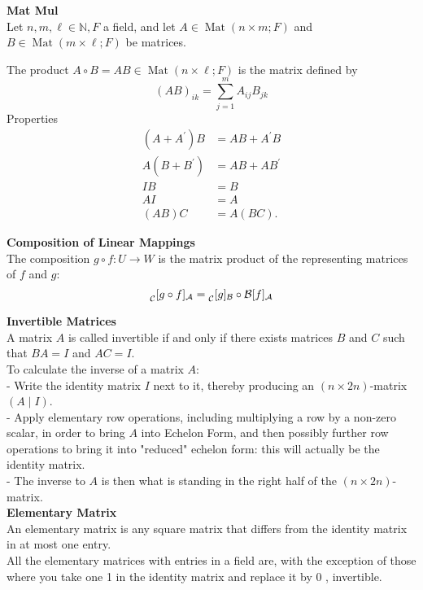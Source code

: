 \documentclass[a4paper, 10pt]{article}
\begin{document}
\begin{multicols*}{3}
\textbf{Mat Mul}\\
Let $n, m, \ell \in \mathbb{N}, F$ a field, and let $A \in \operatorname{Mat}(n \times m ; F)$ and $B \in \operatorname{Mat}(m \times \ell ; F)$ be matrices. 

The product $A \circ B=A B \in \operatorname{Mat}(n \times \ell ; F)$ is the matrix defined by
$$
(A B)_{i k}=\sum_{j=1}^m A_{i j} B_{j k}
$$
Properties\\
\begin{align*}
\left(A+A^{\prime}\right) B & =A B+A^{\prime} B \\
A\left(B+B^{\prime}\right) & =A B+A B^{\prime} \\
I B & =B \\
A I & =A \\
(A B) C & =A(B C) .
\end{align*}

\textbf{Composition of Linear Mappings}\\
The composition $g \circ f: U \rightarrow W$ is the matrix product of the representing matrices of $f$ and $g$:
$$
\prescript{}{\mathcal{C}}{[g \circ f]}_{\mathcal{A}}=\prescript{}{\mathcal{C}}{[g]}_{\mathcal{B}} \circ{ }{\mathcal{B}}[f]_{\mathcal{A}}
$$

\textbf{Invertible Matrices}\\
A matrix $A$ is called invertible if and only if there exists matrices $B$ and $C$ such that $BA=I$ and $AC=I$. \\
To calculate the inverse of a matrix $A$:\\
- Write the identity matrix $I$ next to it, thereby producing an $(n \times 2 n)$-matrix $(A \mid I)$. \\
- Apply elementary row operations, including multiplying a row by a non-zero scalar, in order to bring $A$ into Echelon Form, and then possibly further row operations to bring it into "reduced" echelon form: this will actually be the identity matrix. \\
- The inverse to $A$ is then what is standing in the right half of the $(n \times 2 n)$-matrix. \\

\textbf{Elementary Matrix}\\
An elementary matrix is any square matrix that differs from the identity matrix in at most one entry.\\
All the elementary matrices with entries in a field are, with the exception of those where you take one 1 in the identity matrix and replace it by 0 , invertible.


\end{multicols*}
\end{document}
